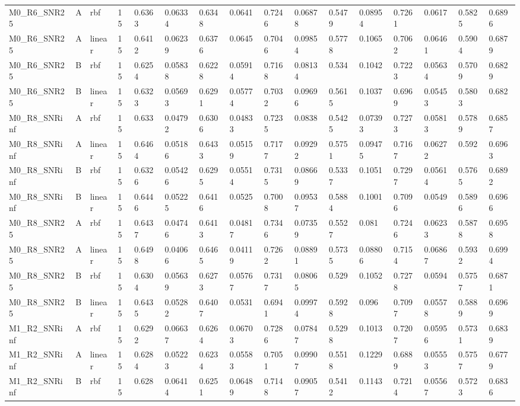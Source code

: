 \begin{tabular}{llllllllllllllll}
M0\_R6\_SNR25 & A & rbf & 15 & 0.6363 & 0.06334 & 0.6348 & 0.0641 & 0.7246 & 0.06878 & 0.5479 & 0.08954 & 0.7261 & 0.0617 & 0.5825 & 0.6896 \\
M0\_R6\_SNR25 & A & linear & 15 & 0.6412 & 0.06239 & 0.6376 & 0.0645 & 0.7046 & 0.09854 & 0.5778 & 0.1065 & 0.7062 & 0.06461 & 0.5904 & 0.6879 \\
M0\_R6\_SNR25 & B & rbf & 15 & 0.6254 & 0.05838 & 0.6228 & 0.05914 & 0.7168 & 0.08134 & 0.534 & 0.1042 & 0.7223 & 0.05634 & 0.5709 & 0.6829 \\
M0\_R6\_SNR25 & B & linear & 15 & 0.6323 & 0.05693 & 0.6291 & 0.05774 & 0.7032 & 0.09696 & 0.5615 & 0.1037 & 0.6969 & 0.05453 & 0.5803 & 0.682 \\
M0\_R8\_SNRinf & A & rbf & 15 & 0.633 & 0.04792 & 0.6306 & 0.04833 & 0.7235 & 0.0838 & 0.5425 & 0.07393 & 0.7273 & 0.05813 & 0.5789 & 0.6857 \\
M0\_R8\_SNRinf & A & linear & 15 & 0.6464 & 0.05186 & 0.6433 & 0.05159 & 0.7177 & 0.09292 & 0.5751 & 0.09475 & 0.7167 & 0.06272 & 0.592 & 0.6963 \\
M0\_R8\_SNRinf & B & rbf & 15 & 0.6326 & 0.05426 & 0.6295 & 0.05514 & 0.7315 & 0.08669 & 0.5337 & 0.1051 & 0.7297 & 0.05614 & 0.5765 & 0.6892 \\
M0\_R8\_SNRinf & B & linear & 15 & 0.6446 & 0.05225 & 0.6416 & 0.0525 & 0.7008 & 0.09537 & 0.5884 & 0.1001 & 0.7096 & 0.0549 & 0.5896 & 0.6966 \\
M0\_R8\_SNR25 & A & rbf & 15 & 0.6437 & 0.04746 & 0.6413 & 0.04817 & 0.7346 & 0.07359 & 0.5527 & 0.081 & 0.7246 & 0.06233 & 0.5878 & 0.6958 \\
M0\_R8\_SNR25 & A & linear & 15 & 0.6498 & 0.04066 & 0.6465 & 0.04119 & 0.7262 & 0.08891 & 0.5735 & 0.08806 & 0.7154 & 0.06867 & 0.5932 & 0.6994 \\
M0\_R8\_SNR25 & B & rbf & 15 & 0.6304 & 0.05639 & 0.6273 & 0.05767 & 0.7317 & 0.08065 & 0.529 & 0.1052 & 0.7278 & 0.0594 & 0.5757 & 0.6871 \\
M0\_R8\_SNR25 & B & linear & 15 & 0.6435 & 0.05282 & 0.6407 & 0.0531 & 0.6941 & 0.09974 & 0.5928 & 0.096 & 0.7097 & 0.05578 & 0.5889 & 0.6969 \\
M1\_R2\_SNRinf & A & rbf & 15 & 0.6292 & 0.06637 & 0.6264 & 0.06703 & 0.7286 & 0.07847 & 0.5298 & 0.1013 & 0.7207 & 0.05956 & 0.5731 & 0.6839 \\
M1\_R2\_SNRinf & A & linear & 15 & 0.6284 & 0.05223 & 0.6234 & 0.05583 & 0.7051 & 0.09907 & 0.5518 & 0.1229 & 0.6889 & 0.05553 & 0.5757 & 0.6779 \\
M1\_R2\_SNRinf & B & rbf & 15 & 0.628 & 0.06414 & 0.6251 & 0.06489 & 0.7148 & 0.09057 & 0.5412 & 0.1143 & 0.7214 & 0.05567 & 0.5723 & 0.6836 \\

\end{tabular}
